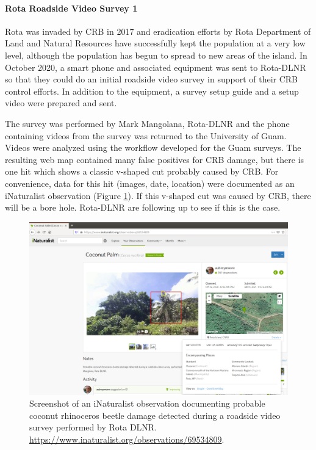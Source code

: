 \documentclass[12pt,letterpaper,english,bibliography=totocnumbered, abstract=on]{scrartcl}
\begin{document}
\clearpage
\paragraph{Rota Roadside Video Survey 1}

Rota was invaded by CRB in 2017 and eradication efforts by Rota Department of Land and Natural Resources have successfully kept the population at a very low level, although the population has begun to spread to new areas of the island. In October 2020, a smart phone and associated equipment was sent to Rota-DLNR so that they could do an initial roadside video survey in support of their CRB control efforts. In addition to the equipment, a survey setup guide \cite{mooreSetAutomatedRoadside2020} and a setup video \cite{mooreYouTubeVideoMounting2020} were prepared and sent.
 
The survey was performed by Mark Mangolana, Rota-DLNR and the phone containing videos from the survey was returned to the University of Guam.  Videos were analyzed using the workflow developed for the Guam surveys. The resulting web map contained many false positives for CRB damage, but there is one hit which shows a classic v-shaped cut probably caused by CRB. For convenience, data for this hit (images, date, location) were documented as an iNaturalist observation (Figure \ref{fig:rota-inat-obs}). If this v-shaped cut was caused by CRB, there will be a bore hole. Rota-DLNR are following up to see if this is the case.


\begin{figure}[h]
	\centering
	\includegraphics[width=1\linewidth]{images/Rota-iNat-obs}
	\caption{Screenshot of an iNaturalist observation documenting probable coconut rhinoceros beetle damage detected during a roadside video survey performed by Rota DLNR. \url{https://www.inaturalist.org/observations/69534809}.}
	\label{fig:rota-inat-obs}
\end{figure}
\end{document}

